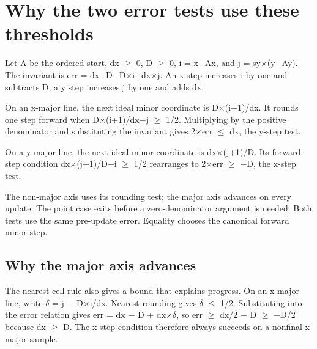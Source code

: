 \section{Why the two error tests use these
  thresholds}\label{007-bresenham-line-x-derivation-why-the-two-error-tests-use-these-thresholds}

Let A be the ordered start, dx \ensuremath{\geq} 0, D \ensuremath{\geq} 0, i = x\ensuremath{-}Ax, and j = sy\ensuremath{\times}(y\ensuremath{-}Ay).
The invariant is err = dx\ensuremath{-}D\ensuremath{-}D\ensuremath{\times}i+dx\ensuremath{\times}j. An x step increases i by one and
subtracts D; a y step increases j by one and adds dx.

On an x-major line, the next ideal minor coordinate is D\ensuremath{\times}(i+1)/dx. It
rounds one step forward when D\ensuremath{\times}(i+1)/dx\ensuremath{-}j \ensuremath{\geq} 1/2. Multiplying by the
positive denominator and substituting the invariant gives 2\ensuremath{\times}err \ensuremath{\leq} dx,
the y-step test.

On a y-major line, the next ideal minor coordinate is dx\ensuremath{\times}(j+1)/D. Its
forward-step condition dx\ensuremath{\times}(j+1)/D\ensuremath{-}i \ensuremath{\geq} 1/2 rearranges to 2\ensuremath{\times}err \ensuremath{\geq} \ensuremath{-}D, the
x-step test.

The non-major axis uses its rounding test; the major axis advances on
every update. The point case exits before a zero-denominator argument is
needed. Both tests use the same pre-update error. Equality chooses the
canonical forward minor step.

\subsection{Why the major axis
  advances}\label{007-bresenham-line-x-derivation-why-the-major-axis-advances}

The nearest-cell rule also gives a bound that explains progress. On an
x-major line, write \ensuremath{\delta} = j \ensuremath{-} D\ensuremath{\times}i/dx. Nearest rounding gives
\textbar \ensuremath{\delta}\textbar{} \ensuremath{\leq} 1/2. Substituting into the error relation gives
err = dx \ensuremath{-} D + dx\ensuremath{\times}\ensuremath{\delta}, so err \ensuremath{\geq} dx/2 \ensuremath{-} D \ensuremath{\geq} \ensuremath{-}D/2 because dx \ensuremath{\geq} D. The x-step
condition therefore always succeeds on a nonfinal x-major sample.

